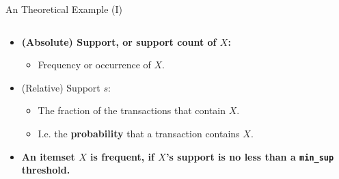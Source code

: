 \begin{frame}{An Theoretical Example (I)}
\begin{columns}
\begin{column}{0.5\textwidth}
\begin{itemize}
				\item \textbf{(Absolute) Support, or support count of $X$:}
				      \begin{itemize}
					      \item Frequency or occurrence of $X$.
				      \end{itemize}
				\item (Relative) Support $s$:
				      \begin{itemize}
					      \item The fraction of the transactions that contain $X$.
					      \item I.e. the \textbf{probability} that a transaction
					            contains $X$.
				      \end{itemize}
				\item \textbf{An itemset $X$ is frequent, if $X$'s support is
					      no less than a \texttt{min\_sup} threshold.}
			\end{itemize}
		\end{column}
	\end{columns}
\end{frame}

